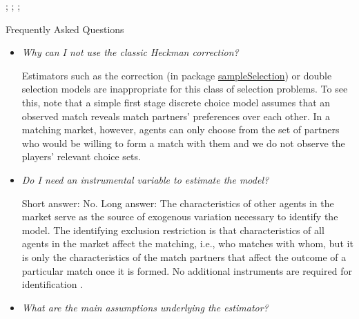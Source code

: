 \citet{Quint1991}; 
\citet{Prosser2014};
\citet{Gale1962};
\citet{Shapley1974}

\noindent Frequently Asked Questions
\begin{itemize}
\item \textit{Why can I not use the classic Heckman correction?}

Estimators such as the \citet{Heckman1979} correction (in package \href{http://cran.r-project.org/web/packages/sampleSelection/index.html}{sampleSelection}) or double selection models are inappropriate for this class of selection problems. To see this, note that a simple first stage discrete choice model assumes that an observed match reveals match partners' preferences over each other. In a matching market, however, agents can only choose from the set of partners who would be willing to form a match with them and we do not observe the players' relevant choice sets. 

\item \textit{Do I need an instrumental variable to estimate the model?}

Short answer: No. Long answer: The characteristics of other agents in the market serve as the source of exogenous variation necessary to identify the model. The identifying exclusion restriction is that characteristics of all agents in the market affect the matching, i.e., who matches with whom, but it is only the characteristics of the match partners that affect the outcome of a particular match once it is formed. No additional instruments are required for identification \citep{Sorensen2007}. 

\item \textit{What are the main assumptions underlying the estimator?}


\end{itemize}
